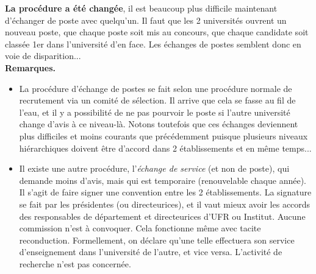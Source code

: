 \textbf{La proc\'edure a \'et\'e chang\'ee}, il est beaucoup plus difficile maintenant d'\'echanger de poste avec quelqu'un. 
Il faut que les 2 universit\'es ouvrent un nouveau poste, que chaque poste soit mis au concours, que chaque candidat\mp e soit class\'e\mp e 1er dans l'universit\'e d'en face. 
Les \'echanges de postes semblent donc en voie de disparition... \\

{\bf Remarques.}
\begin{itemize}
\item La proc\'edure d'\'echange de postes se fait selon une proc\'edure normale de recrutement via un comit\'e de s\'election. Il arrive que cela se fasse au fil de l'eau, et il y a possibilit\'e de ne pas pourvoir le poste si l'autre universit\'e change d'avis \`a ce niveau-l\`a. Notons toutefois que ces \og \'echanges\fg{} deviennent plus difficiles et moins courants que pr\'ec\'edemment puisque plusieurs niveaux hi\'erarchiques doivent \^etre d'accord dans 2 \'etablissements et en m\^eme temps...
\item Il existe une autre proc\'edure, l'{\em \'echange de service}
(et non de poste), qui demande moins d'avis, mais qui est temporaire
(renouvelable chaque ann\'ee).
Il s'agit de faire signer une convention entre les
2 \'etablissements. La signature se fait par les pr\'esident\mp e\mp s (ou
directeur\mp ice\mp s), et il vaut mieux avoir les accords des responsables de
d\'epartement et directeur\mp ice\mp s d'UFR ou Institut. Aucune commission
n'est \`a convoquer. Cela fonctionne m\^eme avec tacite
reconduction. Formellement, on d\'eclare qu'un\mp e tel\mp le effectuera son
service d'enseignement dans l'universit\'e de l'autre, et vice
versa. L'activit\'e de recherche n'est pas concern\'ee.
\end{itemize}

